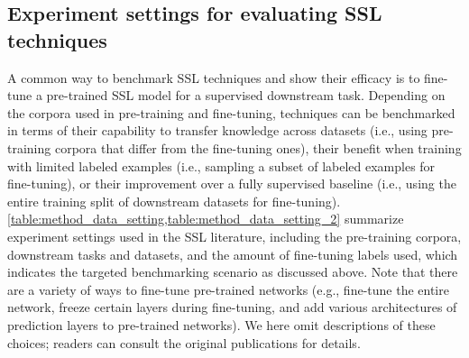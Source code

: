 \subsection{Experiment settings for evaluating SSL techniques}
A common way to benchmark SSL techniques and show their efficacy is to
fine-tune a pre-trained SSL model for a supervised downstream task.
Depending on the corpora used in pre-training and fine-tuning, techniques can
be benchmarked in terms of their capability to transfer knowledge across datasets
(i.e., using pre-training corpora that differ from the fine-tuning ones), their
benefit when training with limited labeled examples (i.e., sampling a subset of
labeled examples for fine-tuning), or their improvement over a fully supervised
baseline (i.e., using the entire training split of downstream datasets for
fine-tuning). \cref{table:method_data_setting,table:method_data_setting_2} summarize experiment settings used in the
SSL literature, including the pre-training corpora, downstream tasks and datasets,
and the amount of fine-tuning labels used, which indicates the targeted
benchmarking scenario as discussed above. Note that there are a variety of ways
to fine-tune pre-trained networks (e.g., fine-tune the entire network,
freeze certain layers during fine-tuning, and add various architectures of
prediction layers to pre-trained networks). We here omit
descriptions of these choices; readers can consult the
original publications for details.

